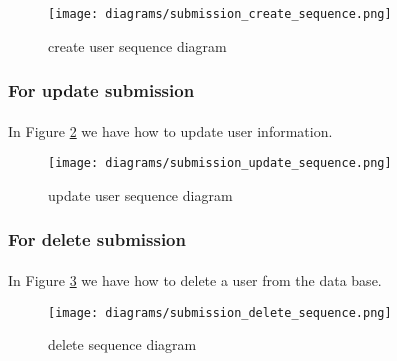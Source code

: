 		\begin{figure}[!ht]
			\centering
			\texttt{[image: diagrams/submission\_create\_sequence.png]}
			\caption{create user sequence diagram}
			\label{fig:submission-create-s-d}
		\end{figure}
	
	\subsubsection{For update submission}
	\paragraph{}
	In Figure \ref{fig:submission-update-s-d} we have how to update user information.
	
		\begin{figure}[!ht]
			\centering
			\texttt{[image: diagrams/submission\_update\_sequence.png]}
			\caption{update user sequence diagram}
			\label{fig:submission-update-s-d}
		\end{figure}
	
	\subsubsection{For delete submission}
	\paragraph{}
	In Figure \ref{fig:submission-delete-s-d} we have how to delete a user from the data base.
	
		\begin{figure}[!ht]
			\centering
			\texttt{[image: diagrams/submission\_delete\_sequence.png]}
			\caption{delete sequence diagram}
			\label{fig:submission-delete-s-d}
		\end{figure}